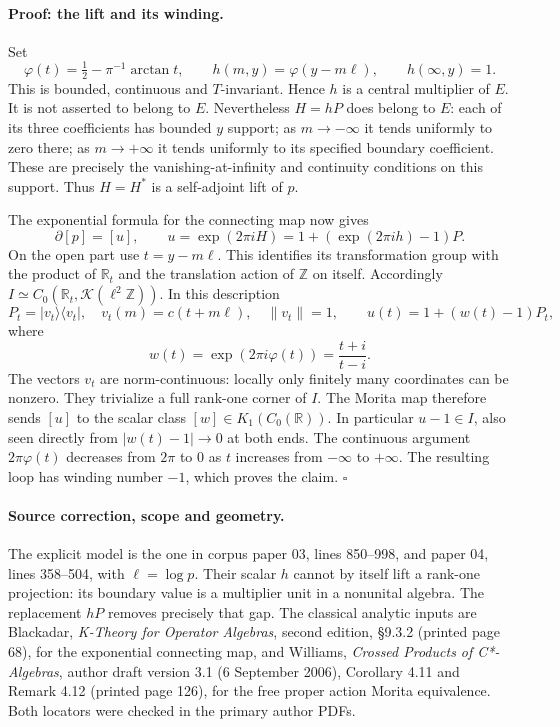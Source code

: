 \paragraph{Proof: the lift and its winding.}
Set
\[
\varphi(t)=\tfrac12-\pi^{-1}\arctan t,
\qquad h(m,y)=\varphi(y-m\ell),\qquad h(\infty,y)=1.
\]
This is bounded, continuous and $T$-invariant. Hence $h$ is a
central multiplier of $E$. It is not asserted to belong to $E$.
Nevertheless $H=hP$ does belong to $E$: each of its three
coefficients has bounded $y$ support; as $m\to-\infty$ it tends
uniformly to zero there; as $m\to+\infty$ it tends uniformly to
its specified boundary coefficient. These are precisely the
vanishing-at-infinity and continuity conditions on this support.
Thus $H=H^*$ is a self-adjoint lift of $p$.

The exponential formula for the connecting map now gives
\[
\partial[p]=[u],\qquad
u=\exp(2\pi iH)=1+(\exp(2\pi ih)-1)P.
\]
On the open part use $t=y-m\ell$. This identifies its transformation
group with the product of $\mathbb R_t$ and the translation action
of $\mathbb Z$ on itself. Accordingly
$I\simeq C_0(\mathbb R_t,\mathcal K(\ell^2\mathbb Z))$.
In this description
\[
P_t=|v_t\rangle\langle v_t|,\quad
v_t(m)=c(t+m\ell),\quad \|v_t\|=1,
\qquad
u(t)=1+(w(t)-1)P_t,
\]
where
\[
w(t)=\exp(2\pi i\varphi(t))=\frac{t+i}{t-i}.
\]
The vectors $v_t$ are norm-continuous: locally only finitely many
coordinates can be nonzero. They trivialize a full rank-one
corner of $I$. The Morita map therefore sends $[u]$ to the scalar
class $[w]\in K_1(C_0(\mathbb R))$. In particular
$u-1\in I$, also seen directly from $|w(t)-1|\to0$ at both ends.
The continuous argument $2\pi\varphi(t)$ decreases from $2\pi$
to $0$ as $t$ increases from $-\infty$ to $+\infty$.
The resulting loop has winding number $-1$, which proves the claim.
\hfill$\square$

\paragraph{Source correction, scope and geometry.}
The explicit model is the one in corpus paper 03, lines 850--998,
and paper 04, lines 358--504, with $\ell=\log p$. Their scalar
$h$ cannot by itself lift a rank-one projection: its boundary
value is a multiplier unit in a nonunital algebra. The replacement
$hP$ removes precisely that gap. The classical analytic inputs
are Blackadar, \emph{K-Theory for Operator Algebras}, second edition,
\S9.3.2 (printed page 68), for the exponential connecting map,
and Williams, \emph{Crossed Products of C*-Algebras}, author draft
version 3.1 (6 September 2006), Corollary 4.11 and Remark 4.12
(printed page 126), for the free proper action Morita equivalence.
Both locators were checked in the primary author PDFs.

